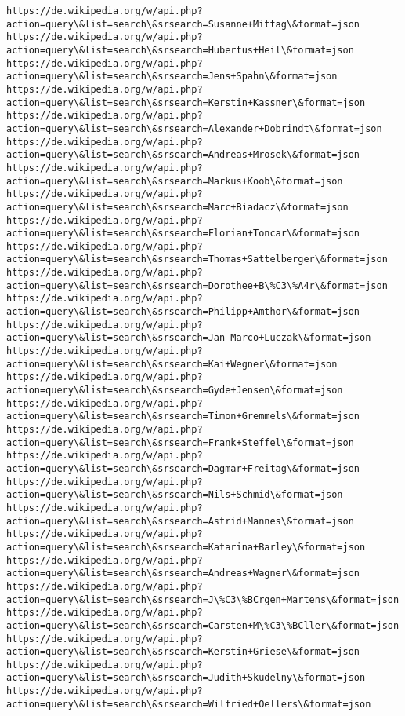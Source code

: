 \documentclass[11pt]{article}
\begin{document}
\begin{Verbatim}[commandchars=\\\{\}]
https://de.wikipedia.org/w/api.php?action=query\&list=search\&srsearch=Susanne+Mittag\&format=json
https://de.wikipedia.org/w/api.php?action=query\&list=search\&srsearch=Hubertus+Heil\&format=json
https://de.wikipedia.org/w/api.php?action=query\&list=search\&srsearch=Jens+Spahn\&format=json
https://de.wikipedia.org/w/api.php?action=query\&list=search\&srsearch=Kerstin+Kassner\&format=json
https://de.wikipedia.org/w/api.php?action=query\&list=search\&srsearch=Alexander+Dobrindt\&format=json
https://de.wikipedia.org/w/api.php?action=query\&list=search\&srsearch=Andreas+Mrosek\&format=json
https://de.wikipedia.org/w/api.php?action=query\&list=search\&srsearch=Markus+Koob\&format=json
https://de.wikipedia.org/w/api.php?action=query\&list=search\&srsearch=Marc+Biadacz\&format=json
https://de.wikipedia.org/w/api.php?action=query\&list=search\&srsearch=Florian+Toncar\&format=json
https://de.wikipedia.org/w/api.php?action=query\&list=search\&srsearch=Thomas+Sattelberger\&format=json
https://de.wikipedia.org/w/api.php?action=query\&list=search\&srsearch=Dorothee+B\%C3\%A4r\&format=json
https://de.wikipedia.org/w/api.php?action=query\&list=search\&srsearch=Philipp+Amthor\&format=json
https://de.wikipedia.org/w/api.php?action=query\&list=search\&srsearch=Jan-Marco+Luczak\&format=json
https://de.wikipedia.org/w/api.php?action=query\&list=search\&srsearch=Kai+Wegner\&format=json
https://de.wikipedia.org/w/api.php?action=query\&list=search\&srsearch=Gyde+Jensen\&format=json
https://de.wikipedia.org/w/api.php?action=query\&list=search\&srsearch=Timon+Gremmels\&format=json
https://de.wikipedia.org/w/api.php?action=query\&list=search\&srsearch=Frank+Steffel\&format=json
https://de.wikipedia.org/w/api.php?action=query\&list=search\&srsearch=Dagmar+Freitag\&format=json
https://de.wikipedia.org/w/api.php?action=query\&list=search\&srsearch=Nils+Schmid\&format=json
https://de.wikipedia.org/w/api.php?action=query\&list=search\&srsearch=Astrid+Mannes\&format=json
https://de.wikipedia.org/w/api.php?action=query\&list=search\&srsearch=Katarina+Barley\&format=json
https://de.wikipedia.org/w/api.php?action=query\&list=search\&srsearch=Andreas+Wagner\&format=json
https://de.wikipedia.org/w/api.php?action=query\&list=search\&srsearch=J\%C3\%BCrgen+Martens\&format=json
https://de.wikipedia.org/w/api.php?action=query\&list=search\&srsearch=Carsten+M\%C3\%BCller\&format=json
https://de.wikipedia.org/w/api.php?action=query\&list=search\&srsearch=Kerstin+Griese\&format=json
https://de.wikipedia.org/w/api.php?action=query\&list=search\&srsearch=Judith+Skudelny\&format=json
https://de.wikipedia.org/w/api.php?action=query\&list=search\&srsearch=Wilfried+Oellers\&format=json

\end{Verbatim}
\end{document}
